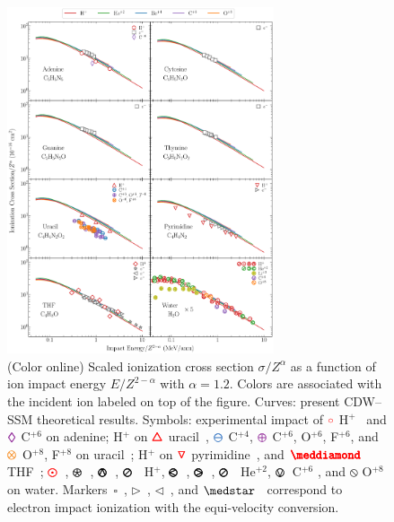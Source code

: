 \documentclass[10pt,showpacs,showkeys,twocolumn]{revtex4}
\begin{document}
\begin{figure}[!t]%
\centering
\includegraphics[width=0.7\textwidth]{zscale_alpha.eps}
\caption{(Color online) Scaled ionization cross section $\sigma/Z^{\alpha}$ as a function of ion impact energy $E/Z^{2-\alpha}$ with $\alpha=1.2$. Colors are associated with the incident ion labeled on top of the figure. Curves: present CDW--SSM theoretical results. Symbols: experimental impact of 
\mbox{\LARGE$\color{red}\circ$} H$^+$~\cite{iriki2011} and
{\fontsize{11}{20}$\color{Purple}\pmb{\lozenge}$} C$^{+6}$ \cite{tribedi2019} on adenine;
H$^+$ on {\fontsize{11}{20}$\color{red}\pmb{\triangle}$} uracil~\cite{itoh2013}, 
{\fontsize{11}{20}$\color{NavyBlue}\pmb{\ominus}$} C$^{+4}$, 
{\fontsize{11}{20}$\color{Purple}\pmb{\oplus}$} C$^{+6}$, O$^{+6}$, F$^{+6}$, and 
{\fontsize{11}{20}$\color{BurntOrange}\pmb{\otimes}$} O$^{+8}$, F$^{+8}$ on uracil~\cite{agnihotri2012,agnihotri2013};
H$^+$ on {\fontsize{11}{20}$\color{red}\pmb{\triangledown}$} pyrimidine~\cite{wolff2014}, and
{\fontsize{10}{20}$\color{red}\pmb{\meddiamond}$} THF~\cite{wang2016};
\mbox{\fontsize{11}{20}$\color{red}\pmb{\odot}$}~\cite{Luna2007}, 
{\fontsize{11}{20}\color{red}$\pmb{\logof}$}~\cite{Rudd86}, 
{\fontsize{11}{20}\color{red}$\pmb{\varowedge}$}~\cite{pRudd85}, 
{\fontsize{11}{20}\color{red}$\pmb{\varoslash}$}~\cite{toburen80} H$^+$,
{\fontsize{11}{20}\color{ForestGreen}$\pmb{\varolessthan}$}~\cite{Ohsawa05},
{\fontsize{11}{20}\color{ForestGreen}$\pmb{\varogreaterthan}$}~\cite{Rudd85},
{\fontsize{11}{20}\color{ForestGreen}$\pmb{\varoslash}$}~\cite{toburen80} He$^{+2}$,
{\fontsize{11}{20}\color{Purple}$\pmb{\ovee}$}~C$^{+6}$ \cite{DalCappello2009,Bhattacharjee17}, and 
{\fontsize{11}{20}\color{BurntOrange}$\pmb{\obslash}$}
O$^{+8}$ \cite{Tribedi_O_water} on water.
Markers~$\square$~\cite{rahman2016}, 
$\rhd$~\cite{bug2017}, 
$\lhd$~\cite{wolf2019}, and 
$\medstar$~\cite{fuss2009} correspond to electron impact ionization with the equi-velocity conversion.}
\label{fig:zreduced}
\end{figure} 
 
\end{document}
